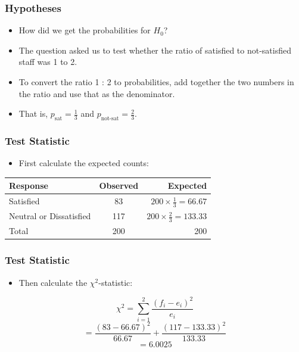 \documentclass[12pt]{beamer}
\begin{document}
\begin{frame}
	\frametitle{Hypotheses}
	
	\begin{itemize}[label={\color{blue}$\blacktriangleright$}]
		\item How did we get the probabilities for $H_0$?
		
		\item The question asked us to test whether the ratio of satisfied to not-satisfied staff was 1 to 2.
		
		\item To convert the ratio 1 : 2 to probabilities, add together the two numbers in the ratio and use that as the denominator.
		
		\item That is, $p_\text{sat} = \frac{1}{3}$ and $p_\text{not-sat} = \frac{2}{3}$.
	\end{itemize}
	
\end{frame}
\begin{frame}
	\frametitle{Test Statistic}
	
	\begin{itemize}[label={\color{blue}$\blacktriangleright$}]
		\item First calculate the expected counts:
	\end{itemize}
	
	\medskip
	
	\begin{center}
		\begin{tabular}{lcr}
			\toprule
			Response & Observed & Expected \\
			\midrule
			Satisfied & 83 & $200 \times \frac{1}{3} = 66.67$ \\
			Neutral or Dissatisfied & 117 & $200 \times \frac{2}{3} = 133.33$ \\
			\midrule
			Total & 200 & 200 \\
			\bottomrule
		\end{tabular}
	\end{center}
	
\end{frame}
\begin{frame}
	\frametitle{Test Statistic}
	
	\begin{itemize}[label={\color{blue}$\blacktriangleright$}]
		\item Then calculate the $\chi^2$-statistic:
	\end{itemize}
	
	\medskip
	
	\[
	\chi^2 = \sum_{i=1}^2 \frac{(f_i - e_i)^2}{e_i}
	\]
	\[
	= \frac{(83 - 66.67)^2}{66.67} + \frac{(117 - 133.33)^2}{133.33}
	\]
	\[
	= 6.0025
	\]
	
\end{frame}
\end{document}
